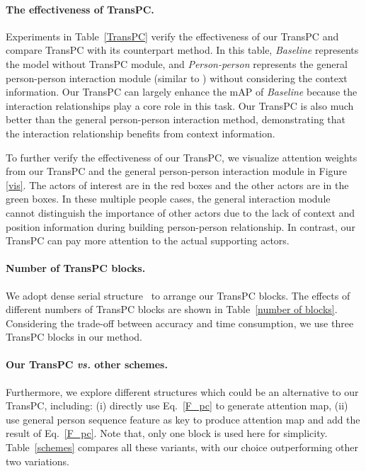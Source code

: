 \documentclass[final]{cvpr}
\begin{document}
\paragraph{The effectiveness of TransPC.}
Experiments in Table~\ref{TransPC} verify the effectiveness of our TransPC and compare TransPC with its counterpart method. In this table, \textit{Baseline} represents the model without TransPC module, and \textit{Person-person} represents the general person-person interaction module (similar to \cite{DBLP:conf/eccv/TangXMPL20}) without considering the context information. Our TransPC can 
largely enhance the mAP of \textit{Baseline} because the interaction relationships play a core role in this task. Our TransPC is also much better than the general person-person interaction method, demonstrating that the interaction relationship benefits from context information.

To further verify the effectiveness of our TransPC, we visualize attention weights from our TransPC and the general person-person interaction module in Figure \ref{vis}. The actors of interest are in the red boxes and the other actors are in the green boxes. In these multiple people cases, the general interaction module cannot distinguish the importance of other actors due to the lack of context and position information during building person-person relationship. In contrast, our TransPC can pay more attention to the actual supporting actors.
\vspace{-3mm}

\paragraph{Number of TransPC blocks.}
We adopt dense serial structure~\cite{DBLP:conf/eccv/TangXMPL20} to arrange our TransPC blocks. The effects of different numbers of TransPC blocks are shown in Table~\ref{number of blocks}. Considering the trade-off between accuracy and time consumption, we use three TransPC blocks in our method.
\vspace{-3mm}

\paragraph{Our TransPC \textit{vs.} other schemes.}
Furthermore, we explore different structures which could be an alternative to our TransPC, including: (i) directly use Eq.~\ref{F_pc} to generate attention map, (ii) use general person sequence feature as key to produce attention map and add the result of Eq.~\ref{F_pc}. Note that, only one block is used here for simplicity. Table~\ref{schemes} compares all these variants, with our choice outperforming other two variations.
\end{document}
